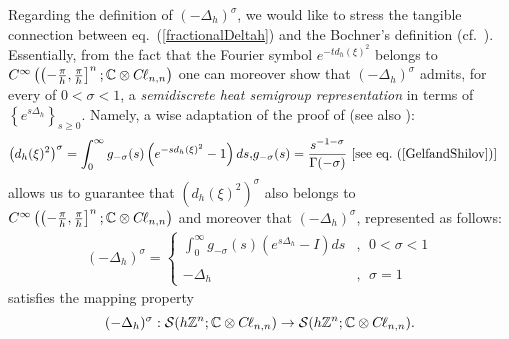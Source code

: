 \documentclass{elsarticle}
\newcommand{\BC}{{\mathbb C}}
\newcommand{\BZ}{{\mathbb Z}}
\newcommand{\Qh}{\left(-\frac{\pi}{h},\frac{\pi}{h}\right]^n}
\newcommand{\cl}{C \kern -0.1em \ell}
\begin{document}
Regarding the definition of $(-\Delta_h)^\sigma$, we would like to stress the tangible connection between eq.~(\ref{fractionalDeltah}) and the Bochner's definition (cf.~\cite[Section 6]{CiaurriGRTV17}). Essentially, from the fact that the Fourier symbol $e^{-td_h(\xi)^2}$ belongs to $C^\infty\left(\Qh;\BC \otimes \cl_{n,n}\right)$ one can moreover show that $(-\Delta_h)^{\sigma}$ admits, for every of $0<\sigma<1$, a {\it semidiscrete heat semigroup representation} in terms of $\left\{e^{s\Delta_h}\right\}_{s\geq 0}$. Namely, a wise adaptation of the proof of \cite[Lemma 6.5.]{LizamaRoncal18} (see also \cite[Section 2.]{CiaurriGRTV18}):
\begin{eqnarray*}
	\left(d_h(\xi)^2\right)^\sigma= \int_{0}^{\infty} g_{-\sigma}(s)\left(e^{-sd_h(\xi)^2}-1\right)ds, &  g_{-\sigma}(s)=\dfrac{s^{-1-\sigma}}{\Gamma(-\sigma)}~  [\mbox{see eq.}~(\ref{GelfandShilov})]
\end{eqnarray*}
allows us to guarantee that $(d_h(\xi)^2)^\sigma$ also belongs to $C^\infty\left(\Qh;\BC \otimes \cl_{n,n}\right)$  
and moreover that $(-\Delta_h)^\sigma$, represented as follows:
\begin{eqnarray*} (-\Delta_h)^\sigma =\left\{\begin{array}{lll} 
		\displaystyle \int_{0}^{\infty} g_{-\sigma}(s)\left(e^{s\Delta_h}-I\right)ds&,~~0<\sigma<1
		\\ \ \\
		-\Delta_h &,~~\sigma=1
	\end{array}\right.
\end{eqnarray*}
satisfies the mapping property
$$(-\Delta_h)^{\sigma}:\mathcal{S}(h\BZ^n;\BC \otimes \cl_{n,n})\rightarrow \mathcal{S}(h\BZ^n;\BC \otimes \cl_{n,n}).$$
\end{document}
